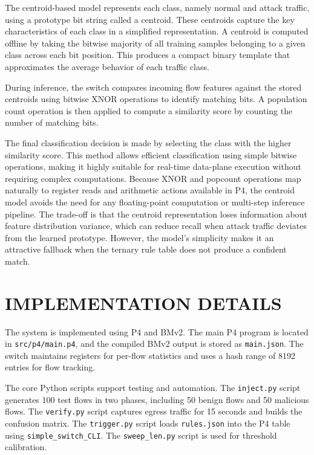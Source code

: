 \documentclass[conference]{IEEEtran}
\begin{document}
The centroid-based model represents each class, namely
normal and attack traffic, using a prototype bit string called
a centroid. These centroids capture the key characteristics of
each class in a simplified representation. A centroid is
computed offline by taking the bitwise majority of all training
samples belonging to a given class across each bit position.
This produces a compact binary template that approximates
the average behavior of each traffic class.

During inference, the switch compares incoming flow features
against the stored centroids using bitwise XNOR operations
to identify matching bits. A population count operation is
then applied to compute a similarity score by counting the
number of matching bits.

The final classification decision is made by selecting the
class with the higher similarity score. This method allows
efficient classification using simple bitwise operations, making
it highly suitable for real-time data-plane execution without
requiring complex computations. Because XNOR and popcount
operations map naturally to register reads and arithmetic
actions available in P4, the centroid model avoids the need
for any floating-point computation or multi-step inference
pipeline. The trade-off is that the centroid representation loses
information about feature distribution variance, which can
reduce recall when attack traffic deviates from the learned
prototype. However, the model's simplicity makes it an
attractive fallback when the ternary rule table does not
produce a confident match.

\section{IMPLEMENTATION DETAILS}

The system is implemented using P4 and BMv2. The
main P4 program is located in \texttt{src/p4/main.p4}, and the
compiled BMv2 output is stored as \texttt{main.json}. The switch
maintains registers for per-flow statistics and uses a hash range
of 8192 entries for flow tracking.

The core Python scripts support testing and automation. The
\texttt{inject.py} script generates 100 test flows in two phases,
including 50 benign flows and 50 malicious flows. The
\texttt{verify.py} script captures egress traffic for 15 seconds
and builds the confusion matrix. The \texttt{trigger.py} script
loads \texttt{rules.json} into the P4 table using
\verb|simple_switch_CLI|. The \verb|sweep_len.py| script is
used for threshold calibration.
\end{document}
